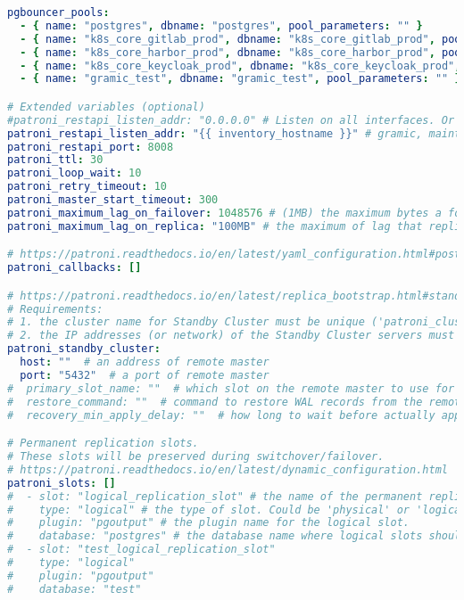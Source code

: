 \begin{flushleft}
\begin{lstlisting}[language=yaml, caption=Testsystem - Anhang - Maintenance - main.yml,captionpos=b,label={lst:testsystem-maintenance-main.yml},breaklines=true]
pgbouncer_pools:
  - { name: "postgres", dbname: "postgres", pool_parameters: "" }
  - { name: "k8s_core_gitlab_prod", dbname: "k8s_core_gitlab_prod", pool_parameters: "" }
  - { name: "k8s_core_harbor_prod", dbname: "k8s_core_harbor_prod", pool_parameters: "" }
  - { name: "k8s_core_keycloak_prod", dbname: "k8s_core_keycloak_prod", pool_parameters: "" }
  - { name: "gramic_test", dbname: "gramic_test", pool_parameters: "" }

# Extended variables (optional)
#patroni_restapi_listen_addr: "0.0.0.0" # Listen on all interfaces. Or use "{{ inventory_hostname }}" to listen on a specific IP address.
patroni_restapi_listen_addr: "{{ inventory_hostname }}" # gramic, maintenance test
patroni_restapi_port: 8008
patroni_ttl: 30
patroni_loop_wait: 10
patroni_retry_timeout: 10
patroni_master_start_timeout: 300
patroni_maximum_lag_on_failover: 1048576 # (1MB) the maximum bytes a follower may lag to be able to participate in leader election.
patroni_maximum_lag_on_replica: "100MB" # the maximum of lag that replica can be in order to be available for read-only queries.

# https://patroni.readthedocs.io/en/latest/yaml_configuration.html#postgresql
patroni_callbacks: []

# https://patroni.readthedocs.io/en/latest/replica_bootstrap.html#standby-cluster
# Requirements:
# 1. the cluster name for Standby Cluster must be unique ('patroni_cluster_name' variable)
# 2. the IP addresses (or network) of the Standby Cluster servers must be added to the pg_hba.conf of the Main Cluster ('postgresql_pg_hba' variable).
patroni_standby_cluster:
  host: ""  # an address of remote master
  port: "5432"  # a port of remote master
#  primary_slot_name: ""  # which slot on the remote master to use for replication (optional)
#  restore_command: ""  # command to restore WAL records from the remote master to standby leader (optional)
#  recovery_min_apply_delay: ""  # how long to wait before actually apply WAL records on a standby leader (optional)

# Permanent replication slots.
# These slots will be preserved during switchover/failover.
# https://patroni.readthedocs.io/en/latest/dynamic_configuration.html
patroni_slots: []
#  - slot: "logical_replication_slot" # the name of the permanent replication slot.
#    type: "logical" # the type of slot. Could be 'physical' or 'logical' (if the slot is logical, you have to define 'database' and 'plugin').
#    plugin: "pgoutput" # the plugin name for the logical slot.
#    database: "postgres" # the database name where logical slots should be created.
#  - slot: "test_logical_replication_slot"
#    type: "logical"
#    plugin: "pgoutput"
#    database: "test"


\end{lstlisting}
\end{flushleft}
